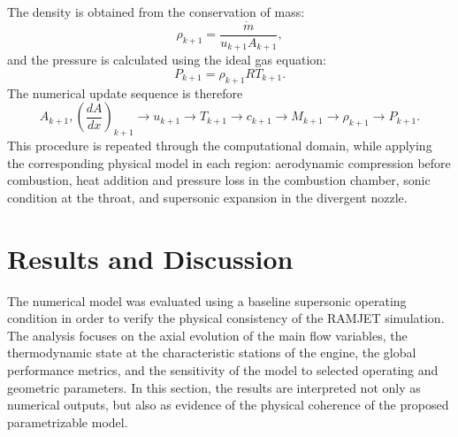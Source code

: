 \documentclass[preprint,12pt]{elsarticle}
\begin{document}
The density is obtained from the conservation of mass:
\begin{equation}
\rho_{k+1}
=
\frac{\dot{m}}
{u_{k+1}A_{k+1}},
\label{eq:density_update}
\end{equation}
and the pressure is calculated using the ideal gas equation:
\begin{equation}
P_{k+1}
=
\rho_{k+1}RT_{k+1}.
\label{eq:pressure_update}
\end{equation}
The numerical update sequence is therefore
\begin{equation}
A_{k+1},\left(\frac{dA}{dx}\right)_{k+1}
\rightarrow
u_{k+1}
\rightarrow
T_{k+1}
\rightarrow
c_{k+1}
\rightarrow
M_{k+1}
\rightarrow
\rho_{k+1}
\rightarrow
P_{k+1}.
\label{eq:update_sequence}
\end{equation}
This procedure is repeated through the computational domain, while applying the corresponding physical model in each region: aerodynamic compression before combustion, heat addition and pressure loss in the combustion chamber, sonic condition at the throat, and supersonic expansion in the divergent nozzle.
\section{Results and Discussion}
\label{sec:results}
The numerical model was evaluated using a baseline supersonic operating condition in order to verify the physical consistency of the RAMJET simulation. The analysis focuses on the axial evolution of the main flow variables, the thermodynamic state at the characteristic stations of the engine, the global performance metrics, and the sensitivity of the model to selected operating and geometric parameters. In this section, the results are interpreted not only as numerical outputs, but also as evidence of the physical coherence of the proposed parametrizable model.
\end{document}

